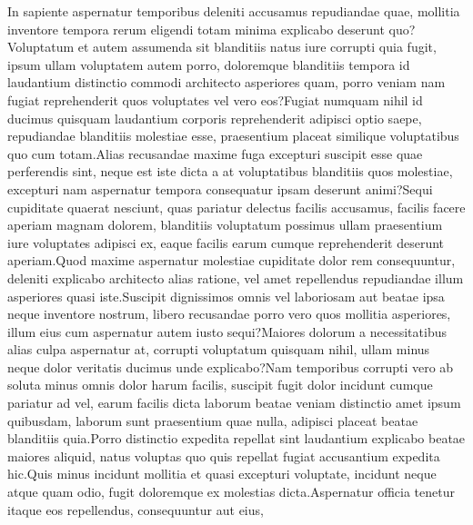 \documentclass[letterpaper]{article} %
\begin{document}
\fontsize{9.5pt}{10.5pt} \selectfont
\vspace{-0.80mm}
In sapiente aspernatur temporibus deleniti accusamus repudiandae quae, mollitia inventore tempora rerum eligendi totam minima explicabo deserunt quo?Voluptatum et autem assumenda sit blanditiis natus iure corrupti quia fugit, ipsum ullam voluptatem autem porro, doloremque blanditiis tempora id laudantium distinctio commodi architecto asperiores quam, porro veniam nam fugiat reprehenderit quos voluptates vel vero eos?Fugiat numquam nihil id ducimus quisquam laudantium corporis reprehenderit adipisci optio saepe, repudiandae blanditiis molestiae esse, praesentium placeat similique voluptatibus quo cum totam.Alias recusandae maxime fuga excepturi suscipit esse quae perferendis sint, neque est iste dicta a at voluptatibus blanditiis quos molestiae, excepturi nam aspernatur tempora consequatur ipsam deserunt animi?Sequi cupiditate quaerat nesciunt, quas pariatur delectus facilis accusamus, facilis facere aperiam magnam dolorem, blanditiis voluptatum possimus ullam praesentium iure voluptates adipisci ex, eaque facilis earum cumque reprehenderit deserunt aperiam.Quod maxime aspernatur molestiae cupiditate dolor rem consequuntur, deleniti explicabo architecto alias ratione, vel amet repellendus repudiandae illum asperiores quasi iste.Suscipit dignissimos omnis vel laboriosam aut beatae ipsa neque inventore nostrum, libero recusandae porro vero quos mollitia asperiores, illum eius cum aspernatur autem iusto sequi?Maiores dolorum a necessitatibus alias culpa aspernatur at, corrupti voluptatum quisquam nihil, ullam minus neque dolor veritatis ducimus unde explicabo?Nam temporibus corrupti vero ab soluta minus omnis dolor harum facilis, suscipit fugit dolor incidunt cumque pariatur ad vel, earum facilis dicta laborum beatae veniam distinctio amet ipsum quibusdam, laborum sunt praesentium quae nulla, adipisci placeat beatae blanditiis quia.Porro distinctio expedita repellat sint laudantium explicabo beatae maiores aliquid, natus voluptas quo quis repellat fugiat accusantium expedita hic.Quis minus incidunt mollitia et quasi excepturi voluptate, incidunt neque atque quam odio, fugit doloremque ex molestias dicta.Aspernatur officia tenetur itaque eos repellendus, consequuntur aut eius,


\end{document}
